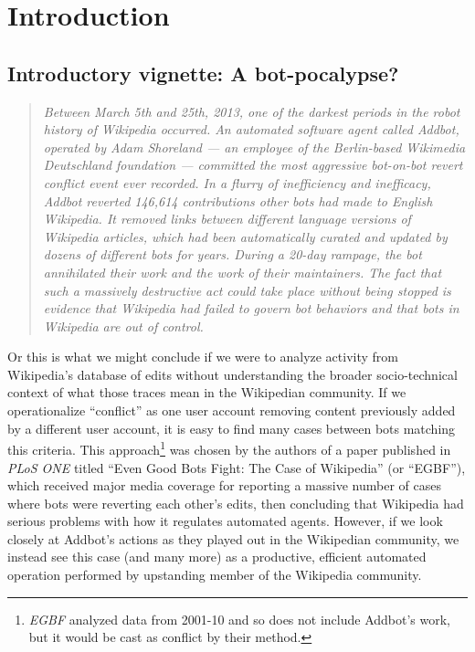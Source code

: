 \documentclass[format=acmsmall, review=false, screen=true]{acmart}%
\begin{document}
\section{Introduction}
  
\subsection{Introductory vignette: A bot-pocalypse?}   \label{s:intro:vignette}
\begin{quote}
\textit{Between March 5th and 25th, 2013, one of the darkest periods in the robot history of Wikipedia occurred. An automated software agent called Addbot, operated by Adam Shoreland --- an employee of the Berlin-based Wikimedia Deutschland foundation --- committed the most aggressive bot-on-bot revert conflict event ever recorded. In a flurry of inefficiency and inefficacy, Addbot reverted 146,614 contributions other bots had made to English Wikipedia. It removed links between different language versions of Wikipedia articles, which had been automatically curated and updated by dozens of different bots for years. During a 20-day rampage, the bot annihilated their work and the work of their maintainers. The fact that such a massively destructive act could take place without being stopped is evidence that Wikipedia had failed to govern bot behaviors and that bots in Wikipedia are out of control.}
\end{quote}

Or this is what we might conclude if we were to analyze activity from Wikipedia's database of edits without understanding the broader socio-technical context of what those traces mean in the Wikipedian community. If we operationalize ``conflict'' as one user account removing content previously added by a different user account, it is easy to find many cases between bots matching this criteria. This approach\footnote { \textit{EGBF} analyzed data from 2001-10 and so does not include Addbot's work, but it would be cast as conflict by their method.} was chosen by the authors of a paper published in \textit{PLoS ONE} titled ``Even Good Bots Fight: The Case of Wikipedia'' \cite{Tsvetkova2017} (or ``EGBF''), which received major media coverage for reporting a massive number of cases where bots were reverting each other's edits, then concluding that Wikipedia had serious problems with how it regulates automated agents. However, if we look closely at Addbot's actions as they played out in the Wikipedian community, we instead see this case (and many more) as a productive, efficient automated operation performed by upstanding member of the Wikipedia community.
\end{document}

